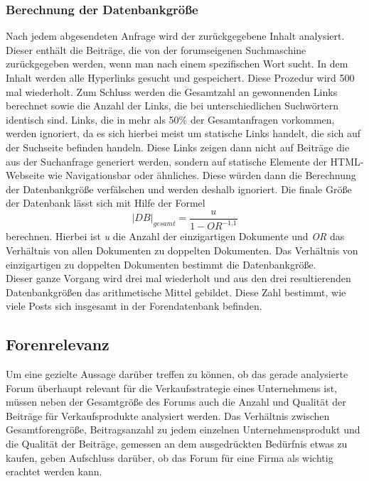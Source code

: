 \subsubsection{Berechnung der Datenbankgröße}
Nach jedem abgesendeten Anfrage wird der zurückgegebene Inhalt analysiert. Dieser enthält die Beiträge, die von der 
forumseigenen Suchmaschine zurückgegeben werden, wenn man nach einem spezifischen Wort sucht. In dem Inhalt werden alle Hyperlinks gesucht und gespeichert. Diese Prozedur wird 500 mal wiederholt. Zum Schluss werden die Gesamtzahl an gewonnenden Links berechnet sowie die Anzahl der Links, die bei unterschiedlichen Suchwörtern identisch sind. Links, die in mehr als 50\% der Gesamtanfragen vorkommen, werden ignoriert, da es sich hierbei meist um statische Links handelt, die sich auf der Suchseite befinden handeln. Diese Links zeigen dann nicht auf Beiträge die aus der Suchanfrage generiert werden, sondern auf statische Elemente der HTML-Webseite wie Navigationsbar oder ähnliches. Diese würden dann die Berechnung der Datenbankgröße verfälschen und werden deshalb ignoriert.
Die finale Größe der Datenbank lässt sich mit Hilfe der Formel \[|DB|_{gesamt} = \frac{u}{1-OR^{-1.1}}\] berechnen. Hierbei ist \textit{u} die Anzahl der einzigartigen Dokumente und \textit{OR} das Verhältnis von allen Dokumenten zu doppelten Dokumenten. Das Verhältnis von einzigartigen zu doppelten Dokumenten bestimmt die Datenbankgröße\cite{lu2008efficient}.\\
Dieser ganze Vorgang wird drei mal wiederholt und aus den drei resultierenden Datenbankgrößen das arithmetische Mittel gebildet. Diese Zahl bestimmt, wie viele Posts sich insgesamt in der Forendatenbank befinden.



\subsection{Forenrelevanz}
Um eine gezielte Aussage darüber treffen zu können, ob das gerade analysierte Forum überhaupt relevant für die Verkaufsstrategie eines Unternehmens ist, müssen neben der Gesamtgröße des Forums auch die Anzahl und Qualität der Beiträge für Verkaufsprodukte analysiert werden. Das Verhältnis zwischen Gesamtforengröße, Beitragsanzahl zu jedem einzelnen Unternehmensprodukt und die Qualität der Beiträge, gemessen an dem ausgedrückten Bedürfnis etwas zu kaufen, geben Aufschluss darüber, ob das Forum für eine Firma als wichtig erachtet werden kann.

